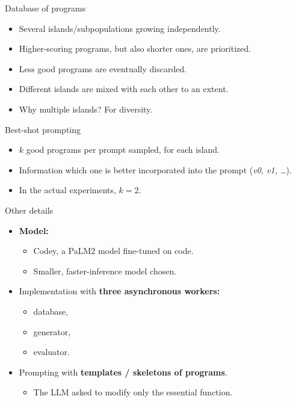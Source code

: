 \documentclass{beamer}
\begin{document}
\begin{frame}{Database of programs}
\begin{itemize}
\item Several islands/subpopulations growing independently.
\item Higher-scoring programs, but also shorter ones, are prioritized.
\item Less good programs are eventually discarded.
\item Different islands are mixed with each other to an extent.
\item Why multiple islands? For diversity.
\end{itemize}
\end{frame}

\begin{frame}{Best-shot prompting}
\begin{itemize}
\item $k$ good programs per prompt sampled, for each island.
\item Information which one is better incorporated into the prompt (\textit{v0,
v1, \ldots}).
\item In the actual experiments, $k = 2$.
\end{itemize}
\end{frame}

\begin{frame}{Other details}
\begin{itemize}
\item \textbf{Model:}
\begin{itemize}
\item Codey, a PaLM2 model fine-tuned on code.
\item Smaller, faster-inference model chosen.
\end{itemize}
\item Implementation with \textbf{three asynchronous workers:}
\begin{itemize}
\item database,
\item generator,
\item evaluator.
\end{itemize}
\item Prompting with \textbf{templates / skeletons of programs}.
\begin{itemize}
\item The LLM asked to modify only the essential function.
\end{itemize}
\end{itemize}
\end{frame}
\end{document}
